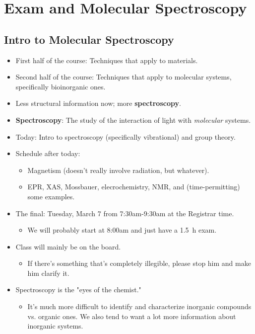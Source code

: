 \documentclass[../notes.tex]{subfiles}
\begin{document}
\chapter{Exam and Molecular Spectroscopy}
\section{Intro to Molecular Spectroscopy}
\begin{itemize}
    \item {}First half of the course: Techniques that apply to materials.
    \item Second half of the course: Techniques that apply to molecular systems, specifically bioinorganic ones.
    \item Less structural information now; more \textbf{spectroscopy}.
    \item \textbf{Spectroscopy}: The study of the interaction of light with \emph{molecular} systems.
    \item Today: Intro to spectroscopy (specifically vibrational) and group theory.
    \item Schedule after today:
    \begin{itemize}
        \item Magnetism (doesn't really involve radiation, but whatever).
        \item EPR, XAS, Mossbauer, elecrochemistry, NMR, and (time-permitting) some examples.
    \end{itemize}
    \item The final: Tuesday, March 7 from 7:30am-9:30am at the Registrar time.
    \begin{itemize}
        \item We will probably start at 8:00am and just have a \SI{1.5}{\hour} exam.
    \end{itemize}
    \item Class will mainly be on the board.
    \begin{itemize}
        \item If there's something that's completely illegible, please stop him and make him clarify it.
    \end{itemize}
    \item Spectroscopy is the "eyes of the chemist."
    \begin{itemize}
        \item It's much more difficult to identify and characterize inorganic compounds vs. organic ones. We also tend to want a lot more information about inorganic systems.

\end{itemize}
\end{itemize}
\end{document}
